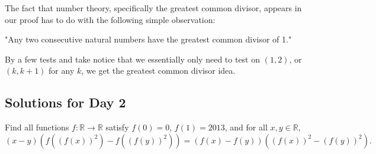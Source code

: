 \documentclass[11pt]{article}
\begin{document}
        \begin{remark}
            The fact that number theory, specifically the greatest common divisor, appears in our proof has to do with the following simple observation:
            \begin{center}
                "Any two consecutive natural numbers have the greatest common divisor of 1."
            \end{center}
            By a few tests and take notice that we essentially only need to test on \((1,2)\), or \((k,k+1)\) for any \(k\), we get the greatest common divisor idea.
        \end{remark}

    \newpage

    \subsection{Solutions for Day 2}

        \begin{problem}
            Find all functions \(f: \mathbb{R} \to \mathbb{R}\) satisfy \(f(0) = 0\), \(f(1) = 2013\), and for all \(x,y \in \mathbb{R}\),
            \begin{equation}
                (x - y)\left(f\left(\left(f(x)\right)^2\right) - f\left(\left(f(y)\right)^2\right)\right) = \left(f(x) - f(y)\right)\left(\left(f(x)\right)^2 - \left(f(y)\right)^2\right).
                \label{e:3}
            \end{equation}
        \end{problem}
\end{document}

